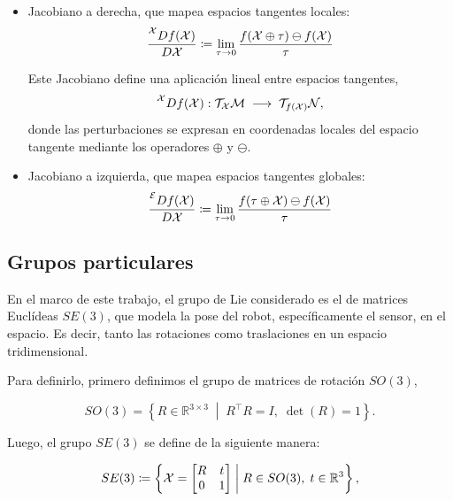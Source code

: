 \begin{itemize}

\item Jacobiano a derecha, que mapea espacios tangentes locales:
\begin{equation}
\begin{split}
\frac{\prescript{\mathcal{X}}{}{Df(\mathcal{X})}}{D\mathcal{X}} \coloneq
\lim_{\tau \to 0} \frac{f(\mathcal{X} \oplus \tau) \ominus f(\mathcal{X})}{\tau}
\end{split}
\end{equation}

Este Jacobiano define una aplicación lineal entre espacios tangentes,
\[
\prescript{\mathcal{X}}{}{Df(\mathcal{X})} :
\mathcal{T}_{\mathcal{X}}\mathcal{M} \;\longrightarrow\; \mathcal{T}_{f(\mathcal{X})}\mathcal{N},
\]
donde las perturbaciones se expresan en coordenadas locales del espacio
tangente mediante los operadores $\oplus$ y $\ominus$.

\item Jacobiano a izquierda, que mapea espacios tangentes globales: 
\begin{equation}
\begin{split}
\frac{\prescript{\mathcal{E}}{}{Df(\mathcal{X})}}{D\mathcal{X}} \coloneq
\lim_{\tau \to 0} \frac{f(\tau \oplus \mathcal{X}) \ominus f(\mathcal{X})}{\tau}
\end{split}
\end{equation}

\end{itemize}

\subsection{Grupos particulares}

En el marco de este trabajo, el grupo de Lie considerado es el de matrices Euclídeas $SE(3)$, que modela la pose del robot, específicamente el sensor, en el espacio. Es decir, tanto las rotaciones como traslaciones en un espacio tridimensional.

Para definirlo, primero definimos el grupo de matrices de rotación $SO(3)$,

$$
SO(3)
=
\left\{
R \in \mathbb{R}^{3 \times 3}
\;\middle|\;
R^\top R = I,\;
\det(R) = 1
\right\}.
$$

Luego, el grupo $SE(3)$ se define de la siguiente manera:

$$
SE(3)
\coloneq
\left\{
\mathcal{X}
=
\begin{bmatrix}
R & t \\
0 & 1
\end{bmatrix}
\;\middle|\;
R \in SO(3),\;
t \in \mathbb{R}^3
\right\},
$$

